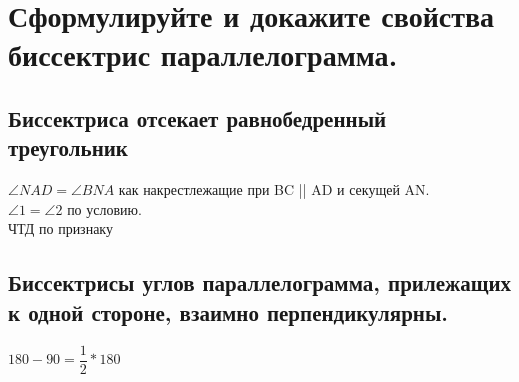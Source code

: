 \documentclass[12pt, letterpaper]{article}
\begin{document}
\section {Сформулируйте и докажите свойства биссектрис параллелограмма.}
\subsection{Биссектриса отсекает равнобедренный треугольник}
$\angle NAD = \angle BNA $ как накрестлежащие при BC || AD и секущей AN. \\
$\angle 1 = \angle 2 $ по условию. \\
ЧТД по признаку \\
\subsection{Биссектрисы углов параллелограмма, прилежащих к одной стороне, взаимно перпендикулярны.}
$180-90=\dfrac{1}{2}*180$\\
\end{document}

